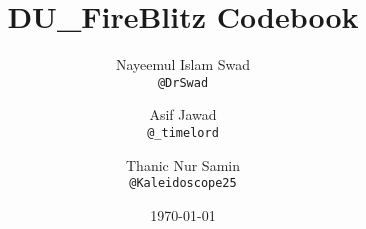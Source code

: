 \documentclass[10pt]{article}
\title{\vspace{8ex}\Large{DU\_FireBlitz Codebook}}
\author{
Nayeemul Islam Swad\\
\texttt{@DrSwad}
\and
Asif Jawad\\
\texttt{@\_timelord}
\and
Thanic Nur Samin\\
\texttt{@Kaleidoscope25}
\and
}
\date{\today}
\begin{document}
\begin{landscape}
\begin{multicols}{2}

\maketitle
\tableofcontents
\pagestyle{fancy}

\begin{figure}[t]

\centering
\end{figure}



\end{multicols}
\end{landscape}
\end{document}
